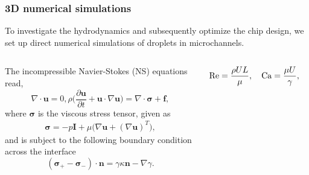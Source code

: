 \begin{frame}
  \frametitle{3D numerical simulations}

  To investigate the hydrodynamics and subsequently optimize the chip design, we set up direct numerical simulations of droplets in microchannels.
  \vskip0.3cm

  \pause
  \begin{columns}[T]

    \begin{column}{0.55\textwidth}
      \begin{bluecolorbox}
        The incompressible Navier-Stokes (NS) equations read,
        \begin{subequations} \label{eq:Navier-Sotkes}
          \begin{equation}
            \nabla \cdot {\bm u} = 0,
            \label{eq:div-free}
          \end{equation}
          \begin{equation}
            \rho \bigg(\frac{\partial {\bm u}}{\partial t} + {\bm u} \cdot \nabla {\bm u} \bigg) = \nabla \cdot {\bm \sigma} + {\bm f},
            \label{eq:NS}
          \end{equation}
        \end{subequations}
        where $\bm \sigma$ is the viscous stress tensor, given as
        \begin{equation}
          \begin{aligned}
            {\bm \sigma} = -p {\bm I}+ \mu \bigg( \nabla {\bm u} + (\nabla {\bm u})^T \bigg),
          \end{aligned}
        \end{equation}
        and is subject to the following boundary condition across the interface
        \begin{equation} \label{eq:stress-bc}
          ({\bm \sigma}_+ - {\bm \sigma}_- ) \cdot {\bm n} = \gamma \kappa {\bm n} - \nabla \gamma.
        \end{equation}
      \end{bluecolorbox}
    \end{column}

    \pause
    \begin{column}{0.4\textwidth}
      \centering
      \begin{bluecolorbox}
        \begin{equation} \notag
          \begin{aligned}
            \textrm{Re} = \frac{\rho UL}{\mu}, \quad
            \textrm{Ca} = \frac{\mu U}{\gamma}, \quad
            \textrm{Fr} = \frac{U^2}{FL}.  
          \end{aligned}
        \end{equation}
      \end{bluecolorbox}
      \vskip0.2cm


\end{column}
\end{columns}
\end{frame}

